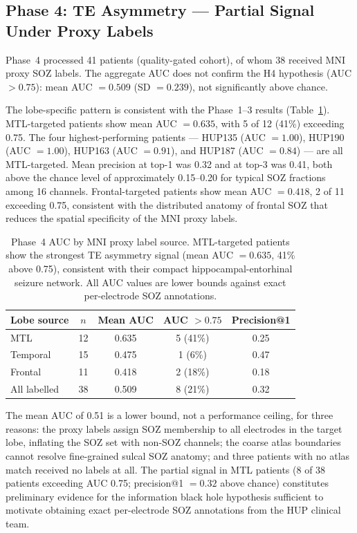 \documentclass[final,5p,times,twocolumn]{elsarticle}
\begin{document}
\subsection{Phase 4: TE Asymmetry --- Partial Signal Under Proxy Labels}

Phase~4 processed 41 patients (quality-gated cohort), of whom 38
received MNI proxy SOZ labels.
%
The aggregate AUC does not confirm the H4 hypothesis
(AUC $> 0.75$): mean AUC $= 0.509$ (SD $= 0.239$), not significantly
above chance.

The lobe-specific pattern is consistent with the Phase~1--3 results
(Table~\ref{tab:phase4}).
%
MTL-targeted patients show mean AUC $= 0.635$, with 5 of 12 (41\%)
exceeding 0.75.
%
The four highest-performing patients --- HUP135 (AUC $= 1.00$), HUP190
(AUC $= 1.00$), HUP163 (AUC $= 0.91$), and HUP187 (AUC $= 0.84$) ---
are all MTL-targeted.
%
Mean precision at top-1 was 0.32 and at top-3 was 0.41, both above the
chance level of approximately 0.15--0.20 for typical SOZ fractions
among 16 channels.
%
Frontal-targeted patients show mean AUC $= 0.418$, 2 of 11 exceeding
0.75, consistent with the distributed anatomy of frontal SOZ that
reduces the spatial specificity of the MNI proxy labels.

\begin{table}[t]
  \centering
  \caption{Phase~4 AUC by MNI proxy label source.
           MTL-targeted patients show the strongest TE asymmetry
           signal (mean AUC $= 0.635$, 41\% above 0.75), consistent
           with their compact hippocampal-entorhinal seizure network.
           All AUC values are lower bounds against exact per-electrode
           SOZ annotations.}
  \label{tab:phase4}
  \begin{tabular}{lcccc}
    \toprule
    Lobe source & $n$ & Mean AUC & AUC $> 0.75$ & Precision@1 \\
    \midrule
    MTL      & 12 & 0.635 & 5 (41\%) & 0.25 \\
    Temporal & 15 & 0.475 & 1 (6\%)  & 0.47 \\
    Frontal  & 11 & 0.418 & 2 (18\%) & 0.18 \\
    All labelled  & 38 & 0.509 & 8 (21\%) & 0.32 \\
    \bottomrule
  \end{tabular}
\end{table}

The mean AUC of 0.51 is a lower bound, not a performance ceiling, for
three reasons: the proxy labels assign SOZ membership to all electrodes
in the target lobe, inflating the SOZ set with non-SOZ channels; the
coarse atlas boundaries cannot resolve fine-grained sulcal SOZ anatomy;
and three patients with no atlas match received no labels at all.
%
The partial signal in MTL patients (8 of 38 patients exceeding AUC
0.75; precision@1 $= 0.32$ above chance) constitutes preliminary
evidence for the information black hole hypothesis sufficient to
motivate obtaining exact per-electrode SOZ annotations from the HUP
clinical team.
\end{document}
